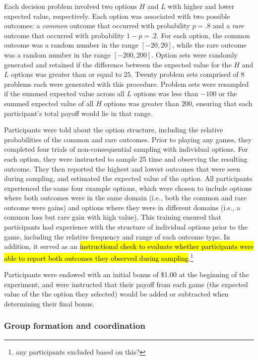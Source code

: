\documentclass[11pt,jou]{apa6}
\begin{document}
Each decision problem involved two options $H$ and $L$ with higher and lower expected value, respectively.
Each option was associated with two possible outcomes: a \emph{common} outcome that occurred with probability $p = .8$ and a \emph{rare} outcome that occurred with probability $1 - p = .2$.
For each option, the common outcome was a random number in the range $[-20, 20]$, while the rare outcome was a random number in the range $[-200, 200]$.
Option sets were randomly generated and retained if the difference between the expected value for the $H$ and $L$ options was greater than or equal to $25$. 
Twenty problem sets comprised of 8 problems each were generated with this procedure.
Problem sets were resampled if the summed expected value across all $L$ options was less than $-100$ or the summed expected value of all $H$ options was greater than $200$, ensuring that each participant's total payoff would lie in that range.

Participants were told about the option structure, including the relative probabilities of the common and rare outcomes.
Prior to playing any games, they completed four trials of non-consequential sampling with individual options.
For each option, they were instructed to sample 25 time and observing the resulting outcome.
They then reported the highest and lowest outcomes that were seen during sampling, and estimated the expected value of the option.
All participants experienced the same four example options, which were chosen to include options where both outcomes were in the same domain (i.e., both the common and rare outcome were gains) and options where they were in different domains (i.e., a common loss but rare gain with high value).
This training ensured that participants had experience with the structure of individual options prior to the game, including the relative frequency and range of each outcome type. 
In addition, it served as an \hl{instructional check to evaluate whether participants were able to report both outcomes they observed during sampling}.\footnote{any participants excluded based on this?}

Participants were endowed with an initial bonus of \$1.00 at the beginning of the experiment, and were instructed that their payoff from each game (the expected value of the the option they selected) would be added or subtracted when determining their final bonus.

\subsubsection{Group formation and coordination}
\end{document}
